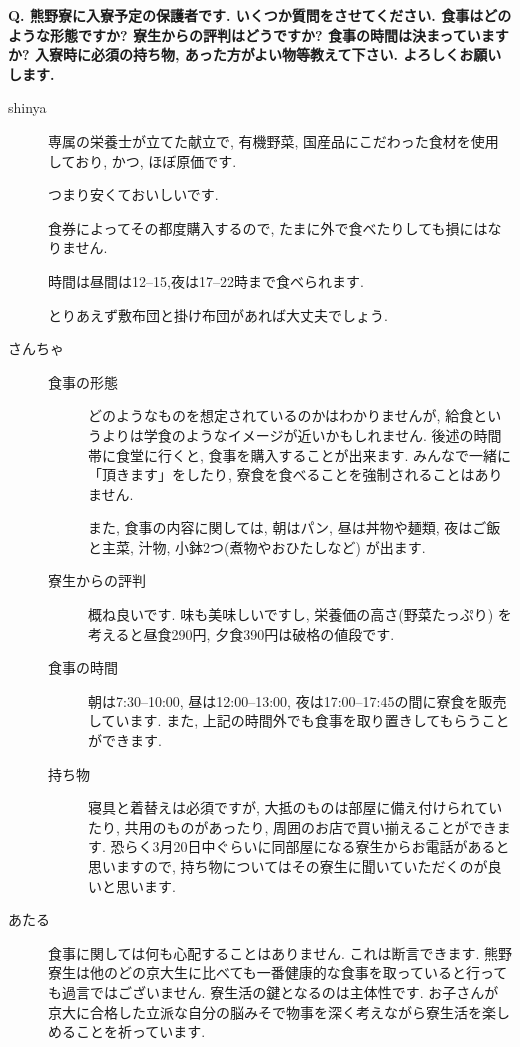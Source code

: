 \documentclass[10pt,b5jsbook,dvips,dvipdfmx,openany]{jsbook}
\theoremstyle{definition}
\begin{document}
\begin{multicols}{2}
		\begin{tcolorbox}
		\textbf{Q. 熊野寮に入寮予定の保護者です. いくつか質問をさせてください.
		食事はどのような形態ですか? 寮生からの評判はどうですか? 食事の時間は決まっていますか? 入寮時に必須の持ち物, あった方がよい物等教えて下さい. よろしくお願いします. }
		\end{tcolorbox}
		\begin{description}
		\item[shinya]
		専属の栄養士が立てた献立で, 有機野菜, 国産品にこだわった食材を使用しており, かつ, ほぼ原価です.

		つまり安くておいしいです.

		食券によってその都度購入するので, たまに外で食べたりしても損にはなりません.

		時間は昼間は12--15,夜は17--22時まで食べられます.

		とりあえず敷布団と掛け布団があれば大丈夫でしょう.

		\item[さんちゃ]
			\begin{description}
			\item[食事の形態]
			どのようなものを想定されているのかはわかりませんが, 給食というよりは学食のようなイメージが近いかもしれません. 後述の時間帯に食堂に行くと, 食事を購入することが出来ます. 	みんなで一緒に「頂きます」をしたり, 寮食を食べることを強制されることはありません.

		また, 食事の内容に関しては, 朝はパン, 昼は丼物や麺類, 夜はご飯と主菜, 汁物, 小鉢2つ(煮物やおひたしなど) が出ます.

			\item[寮生からの評判] 概ね良いです. 味も美味しいですし, 栄養価の高さ(野菜たっぷり) を考えると昼食290円, 夕食390円は破格の値段です.

			\item[食事の時間] 朝は7:30--10:00, 昼は12:00--13:00, 夜は17:00--17:45の間に寮食を販売しています. また, 上記の時間外でも食事を取り置きしてもらうことができます.

			\item[持ち物]寝具と着替えは必須ですが, 大抵のものは部屋に備え付けられていたり, 共用のものがあったり, 周囲のお店で買い揃えることができます. 恐らく3月20日中ぐらいに同部屋になる寮生からお電話があると思いますので, 持ち物についてはその寮生に聞いていただくのが良いと思います.
			\end{description}

		\item[あたる]
		食事に関しては何も心配することはありません. これは断言できます. 熊野寮生は他のどの京大生に比べても一番健康的な食事を取っていると行っても過言ではございません. 寮生活の鍵となるのは主体性です. お子さんが京大に合格した立派な自分の脳みそで物事を深く考えながら寮生活を楽しめることを祈っています.
		\end{description}



		\end{multicols}
\end{document}
